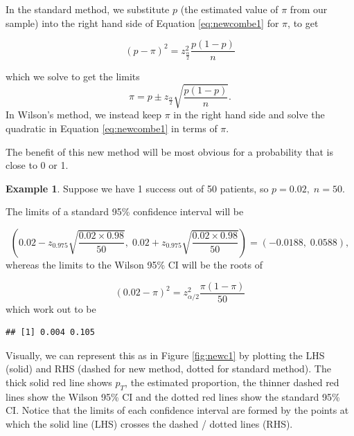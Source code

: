 \documentclass[
  openany]{book}
\theoremstyle{definition}
\theoremstyle{definition}
\newtheorem{example}{Example}[chapter]
\theoremstyle{definition}
\theoremstyle{definition}
\theoremstyle{remark}
\begin{document}
In the standard method, we substitute \(p\) (the estimated value of \(\pi\) from our sample) into the right hand side of Equation \eqref{eq:newcombe1} for \(\pi\), to get

\[\left(p - \pi\right)^2 = z^2_{\frac{\alpha}{2}}\frac{p\left(1-p\right)}{n}\]

which we solve to get the limits
\[ \pi = p \pm z_{\frac{\alpha}{2}}\sqrt{\frac{p\left(1-p\right)}{n}}.\]
In Wilson's method, we instead keep \(\pi\) in the right hand side and solve the quadratic in Equation \eqref{eq:newcombe1} in terms of \(\pi\).

The benefit of this new method will be most obvious for a probability that is close to 0 or 1.

\begin{example}
Suppose we have 1 success out of 50 patients, so \(p=0.02,\;n=50\).

The limits of a standard 95\% confidence interval will be

\[\left(0.02 - z_{0.975}\sqrt{\frac{0.02\times{0.98}}{50}},\; 0.02 + z_{0.975}\sqrt{\frac{0.02\times{0.98}}{50}}\right) = \left(-0.0188,\;0.0588\right),\]
whereas the limits to the Wilson 95\% CI will be the roots of

\[\left(0.02-\pi\right)^2 = z^2_{\alpha/2}\frac{\pi\left(1-\pi\right)}{50}\]
which work out to be

\begin{verbatim}
## [1] 0.004 0.105
\end{verbatim}

Visually, we can represent this as in Figure \ref{fig:newc1} by plotting the LHS (solid) and RHS (dashed for new method, dotted for standard method). The thick solid red line shows \(p_T\), the estimated proportion, the thinner dashed red lines show the Wilson 95\% CI and the dotted red lines show the standard 95\% CI. Notice that the limits of each confidence interval are formed by the points at which the solid line (LHS) crosses the dashed / dotted lines (RHS).
\end{example}
\end{document}
